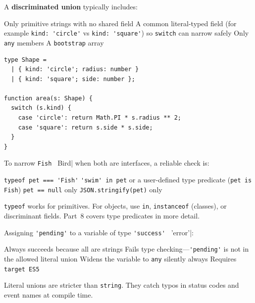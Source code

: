 \question[4]
A \textbf{discriminated union} typically includes:
\begin{choices}
  \choice Only primitive strings with no shared field
  \CorrectChoice A common literal-typed field (for example \lstinline[style=tsinline]|kind: 'circle'| vs \lstinline[style=tsinline]|kind: 'square'|) so \lstinline[style=tsinline]|switch| can narrow safely
  \choice Only \lstinline[style=tsinline]|any| members
  \choice A \texttt{bootstrap} array
\end{choices}
\begin{solution}
\begin{lstlisting}[style=ts]
type Shape =
  | { kind: 'circle'; radius: number }
  | { kind: 'square'; side: number };

function area(s: Shape) {
  switch (s.kind) {
    case 'circle': return Math.PI * s.radius ** 2;
    case 'square': return s.side * s.side;
  }
}
\end{lstlisting}
\end{solution}

\question[4]
To narrow \lstinline[style=tsinline]|Fish | Bird| when both are interfaces, a reliable check is:
\begin{choices}
  \choice \lstinline[style=tsinline]|typeof pet === 'Fish'|
  \CorrectChoice \lstinline[style=tsinline]|'swim' in pet| or a user-defined type predicate (\lstinline[style=tsinline]|pet is Fish|)
  \choice \lstinline[style=tsinline]|pet == null| only
  \choice \lstinline[style=tsinline]|JSON.stringify(pet)| only
\end{choices}
\begin{solution}
  \lstinline[style=tsinline]|typeof| works for primitives. For objects, use \lstinline[style=tsinline]|in|, \lstinline[style=tsinline]|instanceof| (classes), or discriminant fields. Part~8 covers type predicates in more detail.
\end{solution}

\question[4]
Assigning \lstinline[style=tsinline]|'pending'| to a variable of type \lstinline[style=tsinline]|'success' | 'error'|:
\begin{choices}
  \choice Always succeeds because all are strings
  \CorrectChoice Fails type checking---\lstinline[style=tsinline]|'pending'| is not in the allowed literal union
  \choice Widens the variable to \lstinline[style=tsinline]|any| silently always
  \choice Requires \texttt{target ES5}
\end{choices}
\begin{solution}
  Literal unions are stricter than \lstinline[style=tsinline]|string|. They catch typos in status codes and event names at compile time.
\end{solution}

